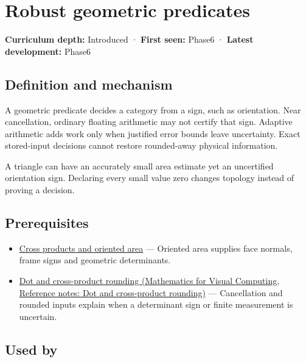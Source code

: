 \hypertarget{appendix-341296fb3f64}{}\label{referencestart:appendix-341296fb3f64}
\section{Robust geometric predicates}\label{appendix-341296fb3f64-robust-geometric-predicates}

\textbf{Curriculum depth:} Introduced · \textbf{First seen:} Phase6 · \textbf{Latest development:} Phase6

\subsection{Definition and mechanism}\label{appendix-341296fb3f64-definition-and-mechanism}

A geometric predicate decides a category from a sign, such as orientation. Near cancellation, ordinary floating arithmetic may not certify that sign. Adaptive arithmetic adds work only when justified error bounds leave uncertainty. Exact stored-input decisions cannot restore rounded-away physical information.

A triangle can have an accurately small area estimate yet an uncertified orientation sign. Declaring every small value zero changes topology instead of proving a decision.

\subsection{Prerequisites}\label{appendix-341296fb3f64-prerequisites}

\begin{itemize}
\tightlist
\item
  \hyperref[appendix-2391db8052b1]{Cross products and oriented area} --- Oriented area supplies face normals, frame signs and geometric determinants.
\item
  \href{../02-Mathematics-for-Visual-Computing/main.pdf\#nameddest=appendix-5aef4f13483a}{Dot and cross-product rounding (Mathematics for Visual Computing, Reference notes: Dot and cross-product rounding)} --- Cancellation and rounded inputs explain when a determinant sign or finite measurement is uncertain.
\end{itemize}

\subsection{Used by}\label{appendix-341296fb3f64-used-by}

